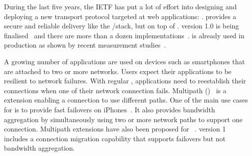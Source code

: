 During the last five years, the IETF has put a lot of effort
into designing and deploying a new transport protocol targeted at web
applications: \quic \cite{langley2017quic}. \quic provides a secure and
reliable delivery like the \tls/\tcp stack, but on top of \udp.
\quic
version 1.0 is being finalised~\cite{draft-ietf-quic-transport} and there are
more than a dozen implementations~\cite{quicimplem,marx2020same}. \quic is
already used in production as shown by recent measurement
studies~\cite{trevisan2020five}.

A growing number of applications are used on devices such as smartphones that
are attached to two or more networks. Users expect their applications to be
resilient to network failures.  With regular \tcp, applications need to
reestablish their connections when one of their network connection fails.
Multipath \tcp (\mptcp)~\cite{rfc8684,raiciu2012hard} is a \tcp extension
enabling a connection to use different paths. One of the main use cases for
\mptcp is to provide fast failovers on iPhones~\cite{bonaventure2016multipath}.
It also provides bandwidth aggregation by simultaneously using two or more
network paths to support one connection. Multipath extensions have also been
proposed for \quic~\cite{viernickel2018multipath,de2017multipath}. \quic version
1~\cite{draft-ietf-quic-transport} includes a connection migration capability
that supports failovers but not bandwidth aggregation.
